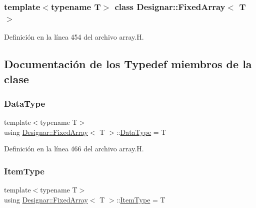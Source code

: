 \subsubsection*{template$<$typename T$>$\newline
class Designar\+::\+Fixed\+Array$<$ T $>$}



Definición en la línea 454 del archivo array.\+H.



\subsection{Documentación de los \textquotesingle{}Typedef\textquotesingle{} miembros de la clase}
\mbox{\label{class_designar_1_1_fixed_array_a3e37931b909b840cb7a40fc73f12bcf5}} 
\subsubsection{\texorpdfstring{Data\+Type}{DataType}}
{\footnotesize\ttfamily template$<$typename T$>$ \\
using \hyperlink{class_designar_1_1_fixed_array}{Designar\+::\+Fixed\+Array}$<$ T $>$\+::\hyperlink{class_designar_1_1_fixed_array_a3e37931b909b840cb7a40fc73f12bcf5}{Data\+Type} =  T}



Definición en la línea 466 del archivo array.\+H.

\mbox{\label{class_designar_1_1_fixed_array_abfeb4e683cee75ae782ad20294c4c808}} 
\subsubsection{\texorpdfstring{Item\+Type}{ItemType}}
{\footnotesize\ttfamily template$<$typename T$>$ \\
using \hyperlink{class_designar_1_1_fixed_array}{Designar\+::\+Fixed\+Array}$<$ T $>$\+::\hyperlink{class_designar_1_1_fixed_array_abfeb4e683cee75ae782ad20294c4c808}{Item\+Type} =  T}



